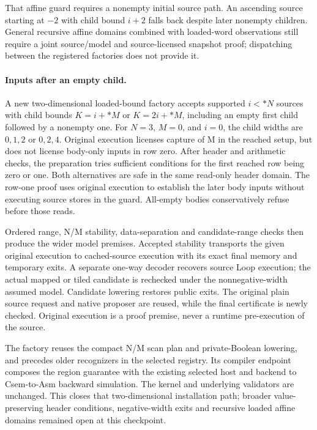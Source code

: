 That affine guard requires a nonempty initial source path. An ascending source
starting at $-2$ with child bound $i+2$ falls back despite later nonempty children.
General recursive affine domains combined with loaded-word observations still
require a joint source/model and source-licensed snapshot proof; dispatching
between the registered factories does not provide it.

\paragraph{Inputs after an empty child.}
A new two-dimensional loaded-bound factory accepts supported
$i<*N$ sources with child bounds $K=i+*M$ or $K=2i+*M$, including an empty
first child followed by a nonempty one. For $N=3$, $M=0$, and $i=0$, the
child widths are $0,1,2$ or $0,2,4$. Original execution licenses capture of M
in the reached setup, but does not license body-only inputs in row zero.
After header and arithmetic checks, the preparation tries sufficient conditions
for the first reached row being zero or one. Both alternatives are safe in
the same read-only header domain. The row-one proof uses original execution
to establish the later body inputs without executing source stores in the guard.
All-empty bodies conservatively refuse before those reads.

Ordered range, N/M stability, data-separation and candidate-range checks then
produce the wider model premises. Accepted stability transports the given
original execution to cached-source execution with its exact final memory and
temporary exits. A separate one-way decoder recovers source Loop execution;
the actual mapped or tiled candidate is rechecked under the nonnegative-width
assumed model. Candidate lowering restores public exits. The original plain
source request and native proposer are reused, while the final certificate
is newly checked. Original execution is a proof premise, never a runtime
pre-execution of the source.

The factory reuses the compact N/M scan plan and private-Boolean lowering,
and precedes older recognizers in the selected registry. Its compiler endpoint
composes the region guarantee with the existing selected host and backend to
Csem-to-Asm backward simulation. The kernel and underlying validators are
unchanged. This closes that two-dimensional installation path; broader
value-preserving header conditions, negative-width exits and recursive loaded
affine domains remained open at this checkpoint.

